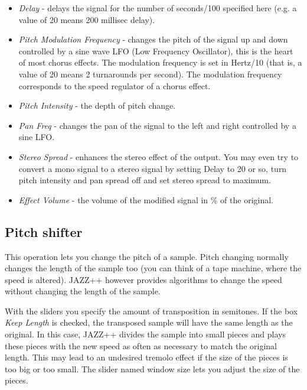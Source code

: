 \documentclass[letterpaper]{report}
\begin{document}
\begin{itemize}

\item {\em Delay} - delays the signal for the number of seconds/100 specified
here (e.g. a value of 20 means 200 millisec delay).

\item {\em Pitch Modulation Frequency} - changes the pitch of the signal up
and down controlled by a sine wave LFO (Low Frequency Oscillator), this is
the heart of most chorus effects.
The modulation frequency is set in Hertz/10 (that is, a value of 20 means 2
turnarounds per second). The modulation frequency corresponds to the speed
regulator of a chorus effect.

\item {\em Pitch Intensity} - the depth of pitch change.

\item {\em Pan Freq} - changes the pan of the signal to the left and right
controlled by a sine LFO.

\item {\em Stereo Spread} - enhances the stereo effect of the output. You
may even try to convert a mono signal to a stereo signal by setting Delay
to 20 or so, turn pitch intensity and pan spread off and set stereo spread
to maximum.

\item {\em Effect Volume} - the volume of the modified signal in \% of the
original.

\end{itemize}



\subsection{Pitch shifter}\label{pitchshifter}

This operation lets you change the pitch of a sample. Pitch changing
normally changes the length of the sample too (you can think of a tape
machine, where the speed is altered). JAZZ++ however provides algorithms
to change the speed without changing the length of the sample.

With the sliders you specify the amount of transposition in semitones.
If the box {\em Keep Length} is checked, the transposed sample will have the
same length as the original. In this case, JAZZ++ divides the sample
into small pieces and plays these pieces with the new speed as often as
necessary to match the original length. This may lead to an undesired
tremolo effect if the size of the pieces is too big or too small. The
slider named window size lets you adjust the size of the pieces.
\end{document}
